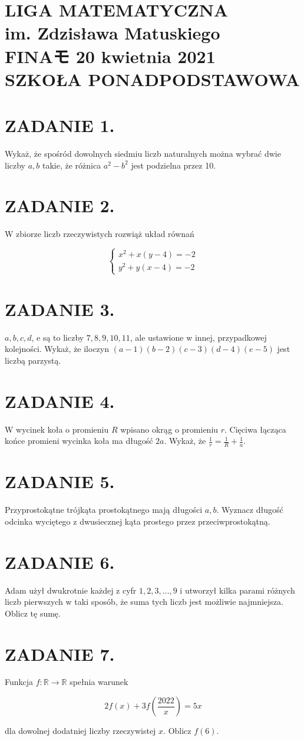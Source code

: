 \documentclass[10pt]{article}
\begin{document}
\section*{LIGA MATEMATYCZNA \\
 im. Zdzisława Matuskiego \\
 FINAモ 20 kwietnia 2021 \\
 SZKOŁA PONADPODSTAWOWA}
\section*{ZADANIE 1.}
Wykaż, że spośród dowolnych siedmiu liczb naturalnych można wybrać dwie liczby \(a, b\) takie, że różnica \(a^{2}-b^{2}\) jest podzielna przez 10.

\section*{ZADANIE 2.}
W zbiorze liczb rzeczywistych rozwiąż układ równań

\[
\left\{\begin{array}{l}
x^{2}+x(y-4)=-2 \\
y^{2}+y(x-4)=-2
\end{array}\right.
\]

\section*{ZADANIE 3.}
\(a, b, c, d\), e są to liczby \(7,8,9,10,11\), ale ustawione w innej, przypadkowej kolejności. Wykaż, że iloczyn \((a-1)(b-2)(c-3)(d-4)(e-5)\) jest liczbą parzystą.

\section*{ZADANIE 4.}
W wycinek koła o promieniu \(R\) wpisano okrąg o promieniu \(r\). Cięciwa łącząca końce promieni wycinka koła ma długość \(2 a\). Wykaż, że \(\frac{1}{r}=\frac{1}{R}+\frac{1}{a}\).

\section*{ZADANIE 5.}
Przyprostokątne trójkąta prostokątnego mają długości \(a, b\). Wyznacz długość odcinka wyciętego z dwusiecznej kąta prostego przez przeciwprostokątną.

\section*{ZADANIE 6.}
Adam użył dwukrotnie każdej z cyfr \(1,2,3, \ldots, 9\) i utworzył kilka parami różnych liczb pierwszych w taki sposób, że suma tych liczb jest możliwie najmniejsza. Oblicz tę sumę.

\section*{ZADANIE 7.}
Funkcja \(f: \mathbb{R} \rightarrow \mathbb{R}\) spełnia warunek

\[
2 f(x)+3 f\left(\frac{2022}{x}\right)=5 x
\]

dla dowolnej dodatniej liczby rzeczywistej \(x\). Oblicz \(f(6)\).
\end{document}
